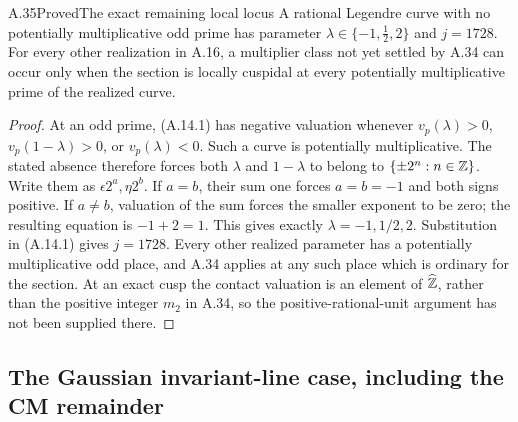\begin{statement}{A.35}{Proved}{The exact remaining local locus}
A rational Legendre curve with no potentially multiplicative odd
prime has parameter $\lambda\in\{-1,\tfrac12,2\}$ and $j=1728$.
For every other realization in A.16, a multiplier class not yet
settled by A.34 can occur only when the section is locally cuspidal
at every potentially multiplicative prime of the realized curve.
\end{statement}
\begin{proof}
At an odd prime, (A.14.1) has negative valuation whenever
$v_p(\lambda)>0$, $v_p(1-\lambda)>0$, or $v_p(\lambda)<0$.
Such a curve is potentially multiplicative.  The stated absence
therefore forces both $\lambda$ and $1-\lambda$ to belong to
$\{\pm2^n:n\in\mathbb Z\}$.  Write them as $\epsilon2^a,\eta2^b$.
If $a=b$, their sum one forces $a=b=-1$ and both signs positive.
If $a\ne b$, valuation of the sum forces the smaller exponent to be
zero; the resulting equation is $-1+2=1$.  This gives exactly
$\lambda=-1,1/2,2$.  Substitution in (A.14.1) gives $j=1728$.
Every other realized parameter has a potentially multiplicative odd
place, and A.34 applies at any such place which is ordinary for the
section.  At an exact cusp the contact valuation is an element of
$\widehat{\mathbb Z}$, rather than the positive integer $m_2$ in A.34, so the
positive-rational-unit argument has not been supplied there.
\end{proof}

\subsection{The Gaussian invariant-line case, including the CM remainder}

